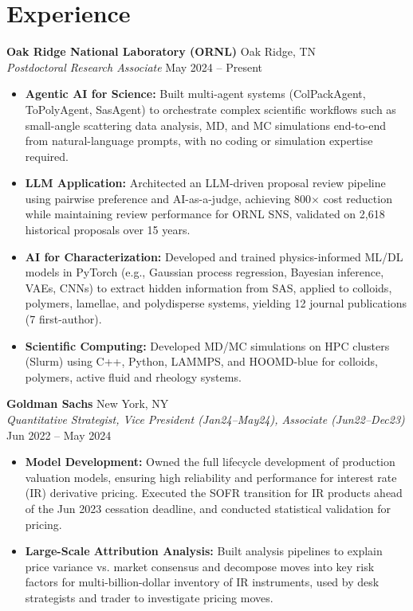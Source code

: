 \documentclass[11pt,letterpaper]{article}
\begin{document}
\section*{Experience}
\textbf{Oak Ridge National Laboratory (ORNL)} \hfill Oak Ridge, TN \\
\textit{Postdoctoral Research Associate} \hfill May 2024 -- Present
\begin{itemize}[leftmargin=*]
    \item \textbf{Agentic AI for Science:} Built multi-agent systems (ColPackAgent, ToPolyAgent, SasAgent) to orchestrate complex scientific workflows such as small-angle scattering data analysis, MD, and MC simulations end-to-end from natural-language prompts, with no coding or simulation expertise required.

    \item \textbf{LLM Application:} Architected an LLM-driven proposal review pipeline using pairwise preference and AI-as-a-judge, achieving 800$\times$ cost reduction while maintaining review performance for ORNL SNS, validated on 2,618 historical proposals over 15 years.

    \item \textbf{AI for Characterization:} Developed and trained physics-informed ML/DL models in PyTorch (e.g., Gaussian process regression, Bayesian inference, VAEs, CNNs) to extract hidden information from SAS, applied to colloids, polymers, lamellae, and polydisperse systems, yielding 12 journal publications (7 first-author).

    \item \textbf{Scientific Computing:} Developed MD/MC simulations on HPC clusters (Slurm) using C++, Python, LAMMPS, and HOOMD-blue for colloids, polymers, active fluid and rheology systems.
\end{itemize}

\textbf{Goldman Sachs} \hfill New York, NY \\
\textit{Quantitative Strategist, Vice President (Jan24--May24), Associate (Jun22--Dec23)} \hfill Jun 2022 -- May 2024
\begin{itemize}[leftmargin=*]
    \item \textbf{Model Development:} Owned the full lifecycle development of production valuation models, ensuring high reliability and performance for interest rate (IR) derivative pricing. Executed the SOFR transition for IR products ahead of the Jun 2023 cessation deadline, and conducted statistical validation for pricing.

    \item \textbf{Large-Scale Attribution Analysis:} Built analysis pipelines to explain price variance vs. market consensus and decompose moves into key risk factors for multi-billion-dollar inventory of IR instruments, used by desk strategists and trader to investigate pricing moves.
\end{itemize}
\end{document}
